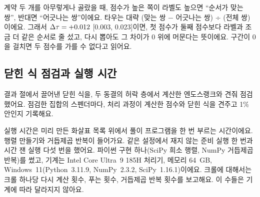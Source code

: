\begin{puri}
계약 두 개를 아무렇게나 골랐을 때, 점수가 높은 쪽이 라벨도 높으면 “순서가 맞는 쌍”, 반대면 “어긋나는 쌍”이에요. 타우는 대략 (맞는 쌍 − 어긋나는 쌍) ÷ (전체 쌍)이에요. 그래서 $\Delta\tau=+0.012$ [0.003, 0.023]이면, 첫 점수가 둘째 점수보다 라벨과 조금 더 같은 순서로 줄 섰고, 다시 뽑아도 그 차이가 0 위에 머문다는 뜻이에요. 구간이 0을 걸치면 두 점수를 가를 수 없다고 읽어요.
\end{puri}

\subsection{닫힌 식 점검과 실행 시간}

결과 절에서 끌어낸 닫힌 식을, 두 동결의 허락 층에서 계산한 엔도스랭크와 견줘 점검했어요. 점검한 집합의 스펜더마다, 처리 과정이 계산한 점수와 닫힌 식을 견주고 1\% 안인지 기록해요.

실행 시간은 미리 만든 화살표 목록 위에서 풀이 프로그램을 한 번 부르는 시간이에요. 행렬 만들기와 거듭제곱 반복이 들어가요. 같은 설정에서 재지 않는 준비 실행 한 번과 시간 잰 실행 다섯 번을 했어요. 파이썬 구현 하나(SciPy 희소 행렬, NumPy 거듭제곱 반복)를 썼고, 기계는 Intel Core Ultra~9 185H 처리기, 메모리 64~GB, Windows~11(Python~3.11.9, NumPy~2.3.2, SciPy~1.16.1)이에요. 크롤에 대해서는 크롤 하나당 다시 계산 횟수, 푸는 횟수, 거듭제곱 반복 횟수를 보고해요. 이 수들은 기계에 따라 달라지지 않아요.
